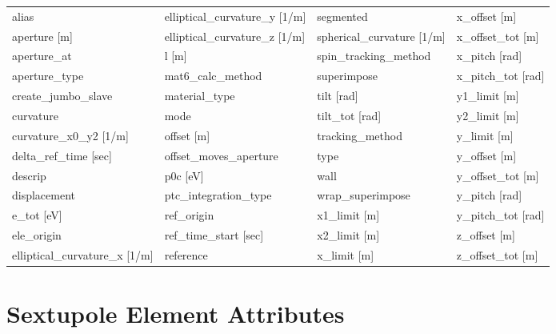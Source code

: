  \begin{tabular}{llll} \toprule
alias                            & elliptical_curvature_y [1/m]     & segmented                        & x_offset [m]                     \\
aperture [m]                     & elliptical_curvature_z [1/m]     & spherical_curvature [1/m]        & x_offset_tot [m]                 \\
aperture_at                      & l [m]                            & spin_tracking_method             & x_pitch [rad]                    \\
aperture_type                    & mat6_calc_method                 & superimpose                      & x_pitch_tot [rad]                \\
create_jumbo_slave               & material_type                    & tilt [rad]                       & y1_limit [m]                     \\
curvature                        & mode                             & tilt_tot [rad]                   & y2_limit [m]                     \\
curvature_x0_y2 [1/m]            & offset [m]                       & tracking_method                  & y_limit [m]                      \\
delta_ref_time [sec]             & offset_moves_aperture            & type                             & y_offset [m]                     \\
descrip                          & p0c [eV]                         & wall                             & y_offset_tot [m]                 \\
displacement                     & ptc_integration_type             & wrap_superimpose                 & y_pitch [rad]                    \\
e_tot [eV]                       & ref_origin                       & x1_limit [m]                     & y_pitch_tot [rad]                \\
ele_origin                       & ref_time_start [sec]             & x2_limit [m]                     & z_offset [m]                     \\
elliptical_curvature_x [1/m]     & reference                        & x_limit [m]                      & z_offset_tot [m]                 \\
 \bottomrule
 \end{tabular}
 \vfill
 
 \section{Sextupole Element Attributes}
 \label{s:list.sextupole}
 
